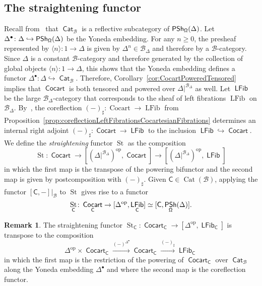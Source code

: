 \documentclass[reqno]{amsart}
\numberwithin{equation}{subsection}
\theoremstyle{plain}
\theoremstyle{definition}
\newtheorem{remark}[equation]{Remark}
\let\scr=\mathcal
\let\into=\hookrightarrow
\def\BB{\scr B}
\DeclareMathOperator{\IPSh}{\mathsf{PSh}}
\DeclareMathOperator{\Cat}{Cat}
\DeclareMathOperator{\ICat}{\mathsf{Cat}}
\DeclareMathOperator{\Cocart}{Cocart}
\DeclareMathOperator{\ICocart}{\mathsf{Cocart}}
\DeclareMathOperator{\LFib}{LFib}
\DeclareMathOperator{\ILFib}{\mathsf{LFib}}
\DeclareMathOperator{\St}{St}
\newcommand{\op}{\mathrm{op}}
\newcommand{\ord}[1]{\langle#1\rangle}
\newcommand{\I}[1]{\mathsf{#1}}
\newcommand{\iFun}[2]{{[#1,#2]}}
\newcommand{\Simp}[1]{#1_{\Delta}}
\begin{document}
\subsection{The straightening functor}
\label{sec:straightening}
Recall from~\cite[Proposition~3.2.12]{Martini2021a} that $\ICat_{\BB}$ is a reflective subcategory of $\IPSh_{\Univ}(\Delta)$. Let $\Delta^{\bullet}\colon\Delta\into\IPSh_{\Univ}(\Delta)$ be the Yoneda embedding. For any $n\geq 0$, the presheaf represented by $\ord{n}\colon 1\to \Delta$ is given by $\Delta^n\in\Simp\BB$ and therefore by a $\BB$-category. Since $\Delta$ is a constant $\BB$-category and therefore generated by the collection of global objects $\ord{n}\colon 1\to \Delta$, this shows that the Yoneda embedding defines a functor $\Delta^\bullet\colon\Delta\into\ICat_{\BB}$. Therefore, Corollary~\ref{cor:CocartPoweredTensored} implies that $\ICocart$ is both tensored and powered over $\Delta\vert^{\Simp\BB}$ as well. Let $\ILFib$ be the large $\Simp\BB$-category that corresponds to the sheaf of left fibrations $\LFib$ on $\Simp\BB$. By~\cite[Corollary~3.2.4]{Martini2021a}, the coreflection $(-)_\sharp\colon\Cocart\to\LFib$ from Proposition~\ref{prop:coreflectionLeftFibrationsCocartesianFibrations} determines an internal right adjoint $(-)_\sharp\colon \ICocart\to\ILFib$ to the inclusion $\ILFib\into\ICocart$. We define the \emph{straightening} functor $\St$ as the composition
\begin{equation*}
\St\colon \ICocart\to \iFun{(\Delta\vert^{\Simp\BB})^{\op}}{\ICocart}\to \iFun{(\Delta\vert^{\Simp\BB})^{\op}}{\ILFib}
\end{equation*}
in which the first map is the transpose of the powering bifunctor and the second map is given by postcomposition with $(-)_\sharp$. Given $\I{C}\in\Cat(\BB)$, applying the functor $\iFun{\I{C}}{-}\vert_{\BB}$ to $\St$ gives rise to a functor
\begin{equation*}
\St_{\I{C}}\colon \ICocart_{\I{C}}\to \iFun{\Delta^{\op}}{\ILFib_{\I{C}}}\simeq  \iFun{\I{C}}{\IPSh_{\Univ}(\Delta)}.
\end{equation*}

\begin{remark}
	\label{rem:straighteningTranposePowering}
	The straightening functor $\St_{\I{C}}\colon \ICocart_{\I{C}}\to\iFun{\Delta^{\op}}{\ILFib_{\I{C}}}$ is transpose to the composition
	\begin{equation*}
	\Delta^{\op}\times\ICocart_{\I{C}}\xrightarrow{(-)^{\Delta^{\bullet}}} \ICocart_{\I{C}}\xrightarrow{(-)_\sharp}\ILFib_{\I{C}}
	\end{equation*}
	in which the first map is the restriction of the powering of $\ICocart_{\I{C}}$ over $\ICat_{\BB}$ along the Yoneda embedding $\Delta^{\bullet}$ and where the second map is the coreflection functor.
\end{remark}
\end{document}
